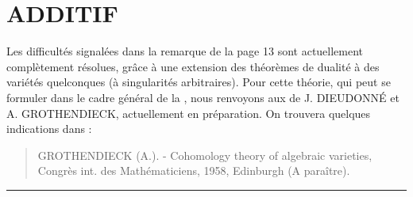 \clearpage
{}
\section*{\centering\normalfont ADDITIF}

Les difficultés signalées dans la remarque de la page 13 sont actuellement
complètement résolues, grâce à une extension des théorèmes de dualité à des
variétés quelconques (à singularités arbitraires). Pour cette théorie, qui peut
se formuler dans le cadre général de la , nous renvoyons
aux  de J. DIEUDONNÉ et A. GROTHENDIECK,
actuellement en préparation. On trouvera quelques indications dans :

\begin{quote}
GROTHENDIECK (A.). - Cohomology theory of algebraic varieties,
Congrès int. des Mathématiciens, 1958, Edinburgh (A paraître).
\end{quote}

\begin{flushright}
[Avril 1959]
\end{flushright}

\begin{center}\rule{36mm}{0.5pt}\end{center}

\par\smallskip
\begingroup\footnotesize
\endgroup
